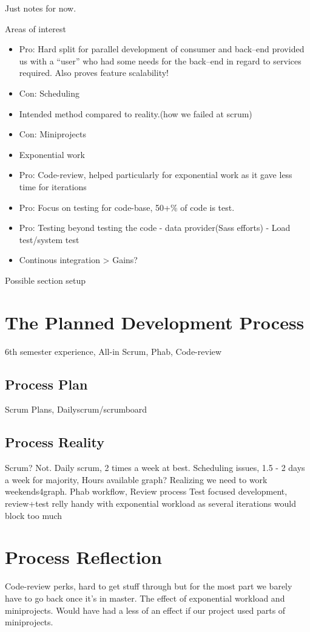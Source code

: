 Just notes for now.

\bigskip
Areas of interest
\begin{itemize}
    \item Pro: Hard split for parallel development of consumer and back--end provided us with a ``user'' who had some needs for the back--end in regard to services required. Also proves feature scalability!
    \item Con: Scheduling
    \item Intended method compared to reality.(how we failed at scrum)
    \item Con: Miniprojects
    \item Exponential work
    \item Pro: Code-review, helped particularly for exponential work as it gave less time for iterations
    \item Pro: Focus on testing for code-base, 50+\% of code is test.
    \item Pro: Testing beyond testing the code -  data provider(Sass efforts) - Load test/system test
    \item Continous integration > Gains?
\end{itemize}

Possible section setup
\section{The Planned Development Process}
6th semester experience, All-in Scrum, Phab, Code-review
\subsection{Process Plan}
Scrum Plans, Dailyscrum/scrumboard
\subsection{Process Reality}
Scrum? Not. Daily scrum, 2 times a week at best. Scheduling issues, 1.5 - 2 days a week for majority, Hours available graph?
Realizing we need to work weekends4graph.
Phab workflow, Review process
Test focused development, review+test relly handy with exponential workload as several iterations would block too much
\section{Process Reflection}
Code-review perks, hard to get stuff through but for the most part we barely have to go back once it's in master.
The effect of exponential workload and miniprojects.
Would have had a less of an effect if our project used parts of miniprojects.
